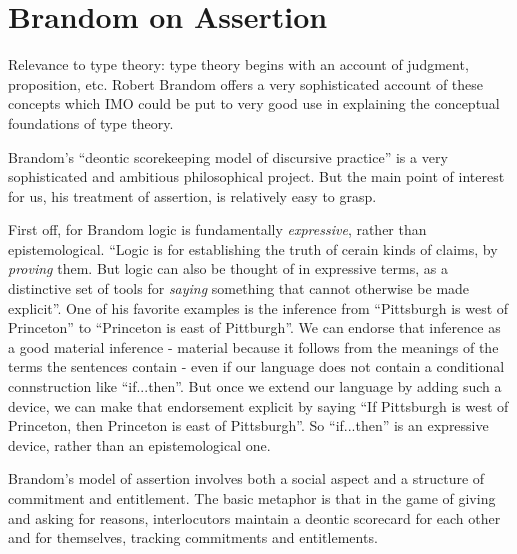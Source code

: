 \section{Brandom on Assertion}
\label{sect:brandom}

\begin{remark}
  Relevance to type theory: type theory begins with an account of
  judgment, proposition, etc.  Robert Brandom offers a very
  sophisticated account of these concepts which IMO could be put to
  very good use in explaining the conceptual foundations of type
  theory.
\end{remark}

Brandom's ``deontic scorekeeping model of discursive practice'' is a
very sophisticated and ambitious philosophical project.  But the main
point of interest for us, his treatment of assertion, is relatively
easy to grasp.

First off, for Brandom logic is fundamentally \textit{expressive},
rather than epistemological.  ``Logic is for establishing the truth of
cerain kinds of claims, by \textit{proving} them.  But logic can also
be thought of in expressive terms, as a distinctive set of tools for
\textit{saying} something that cannot otherwise be made
explicit''.\citep[19]{brandom_articulating_2001} One of his favorite
examples is the inference from ``Pittsburgh is west of Princeton'' to
``Princeton is east of Pittburgh''.  We can endorse that inference as
a good material inference - material because it follows from the
meanings of the terms the sentences contain - even if our language
does not contain a conditional connstruction like ``if...then''.  But
once we extend our language by adding such a device, we can make that
endorsement explicit by saying ``If Pittsburgh is west of Princeton,
then Princeton is east of Pittsburgh''.  So ``if...then'' is an
expressive device, rather than an epistemological one.

Brandom's model of assertion involves both a
social aspect and a structure of commitment and entitlement.  The
basic metaphor is that in the game of giving and asking for reasons,
interlocutors maintain a deontic scorecard for each other and for
themselves, tracking commitments and entitlements.

